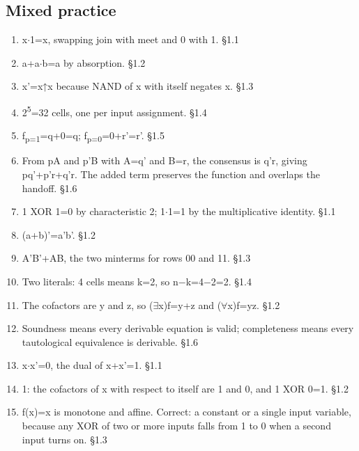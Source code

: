 \documentclass[11pt]{article}
\begin{document}
\begin{keepsection}\subsection{Mixed practice}

\begin{enumerate}
\item x\ensuremath{\cdot}1=x, swapping join with meet and 0 with 1. \hfill{\small\color{FAUblue}§1.1}
\item a+a\ensuremath{\cdot}b=a by absorption. \hfill{\small\color{FAUblue}§1.2}
\item x'=x↑x because NAND of x with itself negates x. \hfill{\small\color{FAUblue}§1.3}
\item 2\textsuperscript{5}=32 cells, one per input assignment. \hfill{\small\color{FAUblue}§1.4}
\item f\textsubscript{p=1}=q+0=q; f\textsubscript{p=0}=0+r'=r'. \hfill{\small\color{FAUblue}§1.5}
\item From pA and p'B with A=q' and B=r, the consensus is q'r, giving pq'+p'r+q'r. The added term preserves the function and overlaps the handoff. \hfill{\small\color{FAUblue}§1.6}
\item 1 XOR 1=0 by characteristic 2; 1\ensuremath{\cdot}1=1 by the multiplicative identity. \hfill{\small\color{FAUblue}§1.1}
\item (a+b)'=a'b'. \hfill{\small\color{FAUblue}§1.2}
\item A'B'+AB, the two minterms for rows 00 and 11. \hfill{\small\color{FAUblue}§1.3}
\item Two literals: 4 cells means k=2, so n\ensuremath{-}k=4\ensuremath{-}2=2. \hfill{\small\color{FAUblue}§1.4}
\item The cofactors are y and z, so (\ensuremath{\exists}x)f=y+z and (\ensuremath{\forall}x)f=yz. \hfill{\small\color{FAUblue}§1.2}
\item Soundness means every derivable equation is valid; completeness means every tautological equivalence is derivable. \hfill{\small\color{FAUblue}§1.6}
\item x\ensuremath{\cdot}x'=0, the dual of x+x'=1. \hfill{\small\color{FAUblue}§1.1}
\item 1: the cofactors of x with respect to itself are 1 and 0, and 1 XOR 0=1. \hfill{\small\color{FAUblue}§1.2}
\item f(x)=x is monotone and affine. Correct: a constant or a single input variable, because any XOR of two or more inputs falls from 1 to 0 when a second input turns on. \hfill{\small\color{FAUblue}§1.3}

\end{enumerate}
\end{keepsection}
\end{document}
